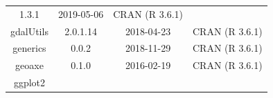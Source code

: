 \documentclass[11pt,]{book}
\begin{document}
\begin{longtable}[]{@{}cccc@{}}
\begin{minipage}[t]{0.19\columnwidth}
1.3.1\strut
\end{minipage} & \begin{minipage}[t]{0.16\columnwidth}\centering\strut
2019-05-06\strut
\end{minipage} & \begin{minipage}[t]{0.36\columnwidth}\centering\strut
CRAN (R 3.6.1)\strut
\end{minipage}\tabularnewline
\begin{minipage}[t]{0.18\columnwidth}\centering\strut
gdalUtils\strut
\end{minipage} & \begin{minipage}[t]{0.19\columnwidth}\centering\strut
2.0.1.14\strut
\end{minipage} & \begin{minipage}[t]{0.16\columnwidth}\centering\strut
2018-04-23\strut
\end{minipage} & \begin{minipage}[t]{0.36\columnwidth}\centering\strut
CRAN (R 3.6.1)\strut
\end{minipage}\tabularnewline
\begin{minipage}[t]{0.18\columnwidth}\centering\strut
generics\strut
\end{minipage} & \begin{minipage}[t]{0.19\columnwidth}\centering\strut
0.0.2\strut
\end{minipage} & \begin{minipage}[t]{0.16\columnwidth}\centering\strut
2018-11-29\strut
\end{minipage} & \begin{minipage}[t]{0.36\columnwidth}\centering\strut
CRAN (R 3.6.1)\strut
\end{minipage}\tabularnewline
\begin{minipage}[t]{0.18\columnwidth}\centering\strut
geoaxe\strut
\end{minipage} & \begin{minipage}[t]{0.19\columnwidth}\centering\strut
0.1.0\strut
\end{minipage} & \begin{minipage}[t]{0.16\columnwidth}\centering\strut
2016-02-19\strut
\end{minipage} & \begin{minipage}[t]{0.36\columnwidth}\centering\strut
CRAN (R 3.6.1)\strut
\end{minipage}\tabularnewline
\begin{minipage}[t]{0.18\columnwidth}\centering\strut
ggplot2\strut
\end{minipage} & \begin{minipage}[t]{0.19\columnwidth}\centering\strut

\end{minipage}
\end{longtable}
\end{document}

